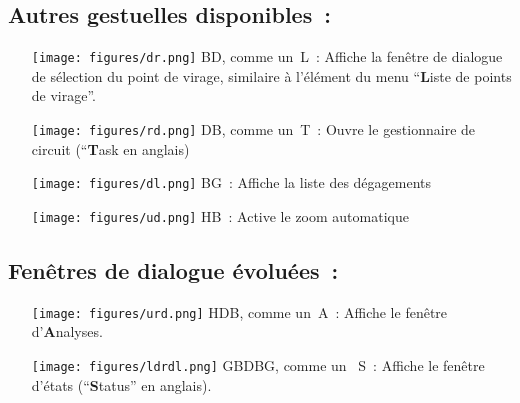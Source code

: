 \subsection*{Autres gestuelles disponibles~:}
\begin{itemize}
\item[\raisebox{-1em}
{\texttt{[image: figures/dr.png]}}] BD, comme un~L~: Affiche la fenêtre de dialogue de sélection du point de virage, similaire à l'élément du menu ``\textbf{L}iste de points de virage''.
\item[\raisebox{-1em}
{\texttt{[image: figures/rd.png]}}] DB, comme un~T~: Ouvre le gestionnaire de circuit (``\textbf{T}ask en anglais)
\item[\raisebox{-1em}
{\texttt{[image: figures/dl.png]}}] BG~: Affiche la liste des dégagements
\item[\raisebox{-1em}
{\texttt{[image: figures/ud.png]}}] HB~: Active le zoom automatique
\end{itemize}
\vspace{2em}

\subsection*{Fenêtres de dialogue évoluées~:}
\begin{itemize}
\item[\raisebox{-1em}
{\texttt{[image: figures/urd.png]}}] HDB, comme un~A~: Affiche le fenêtre d'\textbf{A}nalyses.
\item[\raisebox{-1em}
{\texttt{[image: figures/ldrdl.png]}}] GBDBG, comme un ~S~: Affiche le fenêtre d'états (``\textbf{S}tatus'' en anglais).
\end{itemize}

